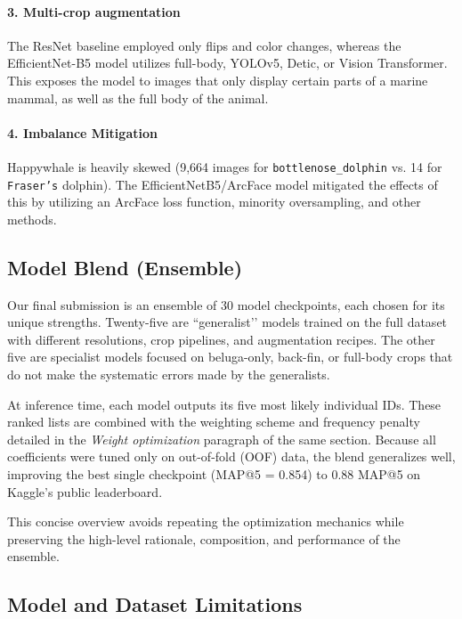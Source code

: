\documentclass[twocolumn]{article}
\begin{document}
\paragraph{3. Multi-crop augmentation}

The ResNet baseline employed only flips and color changes, whereas the EfficientNet-B5 model utilizes full-body, YOLOv5, Detic, or Vision Transformer. This exposes the model to images that only display certain parts of a marine mammal, as well as the full body of the animal. 

\paragraph{4. Imbalance Mitigation}

Happywhale is heavily skewed (9,664 images for \texttt{bottlenose\_dolphin} vs. 14 for \texttt{Fraser's} dolphin). The EfficientNetB5/ArcFace model mitigated the effects of this by utilizing an ArcFace loss function, minority oversampling, and other methods. 

\subsection{Model Blend (Ensemble)}

Our final submission is an ensemble of 30 model checkpoints, each chosen for its unique strengths. Twenty-five are “generalist’’ models trained on the full dataset with different resolutions, crop pipelines, and augmentation recipes. The other five are specialist models focused on beluga-only, back-fin, or full-body crops that do not make the systematic errors made by the generalists.

At inference time, each model outputs its five most likely individual IDs. These ranked lists are combined with the weighting scheme and frequency penalty detailed in the \textit{Weight optimization} paragraph of the same section. Because all coefficients were tuned only on out-of-fold (OOF) data, the blend generalizes well, improving the best single checkpoint (MAP@5 = 0.854) to 0.88 MAP@5 on Kaggle’s public leaderboard.

This concise overview avoids repeating the optimization mechanics while preserving the high-level rationale, composition, and performance of the ensemble.

\subsection{Model and Dataset Limitations}
\end{document}
